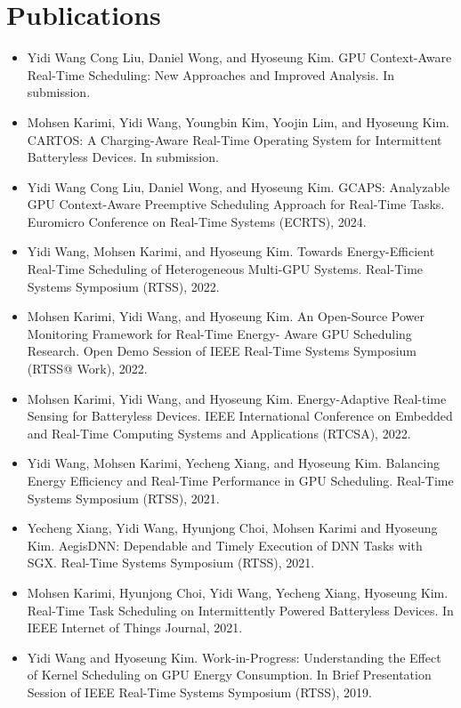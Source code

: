 \documentclass[letterpaper,10pt]{article}
\begin{document}
  \section{Publications}
  \begin{justify}
  \begin{itemize}
      \item Yidi Wang Cong Liu, Daniel Wong, and Hyoseung Kim. GPU Context-Aware Real-Time Scheduling: New Approaches and Improved Analysis. In submission.
      \item Mohsen Karimi, Yidi Wang, Youngbin Kim, Yoojin Lim, and Hyoseung Kim. CARTOS: A Charging-Aware Real-Time Operating System for Intermittent Batteryless Devices. In submission.
    \item Yidi Wang Cong Liu, Daniel Wong, and Hyoseung Kim. GCAPS: Analyzable GPU Context-Aware Preemptive Scheduling Approach for Real-Time Tasks. Euromicro Conference on Real-Time Systems (ECRTS), 2024.
    \item Yidi Wang, Mohsen Karimi, and Hyoseung Kim. Towards Energy-Efficient Real-Time Scheduling of Heterogeneous Multi-GPU Systems. Real-Time Systems Symposium (RTSS), 2022.
    \item Mohsen Karimi, Yidi Wang, and Hyoseung Kim. An Open-Source Power Monitoring Framework for Real-Time Energy- Aware GPU Scheduling Research. Open Demo Session of IEEE Real-Time Systems Symposium (RTSS@ Work), 2022.
    \item Mohsen Karimi, Yidi Wang, and Hyoseung Kim. Energy-Adaptive Real-time Sensing for Batteryless Devices. IEEE International Conference on Embedded and Real-Time Computing Systems and Applications (RTCSA), 2022.
    \item Yidi Wang, Mohsen Karimi, Yecheng Xiang, and Hyoseung Kim. Balancing Energy Efficiency and Real-Time Performance in GPU Scheduling. Real-Time Systems Symposium (RTSS), 2021.
    \item Yecheng Xiang, Yidi Wang, Hyunjong Choi, Mohsen Karimi and Hyoseung Kim. AegisDNN: Dependable and Timely Execution of DNN Tasks with SGX. Real-Time Systems Symposium (RTSS), 2021.
    \item Mohsen Karimi, Hyunjong Choi, Yidi Wang, Yecheng Xiang, Hyoseung Kim. Real-Time Task Scheduling on Intermittently Powered Batteryless Devices. In IEEE Internet of Things Journal, 2021.
    \item Yidi Wang and Hyoseung Kim. Work-in-Progress: Understanding the Effect of Kernel Scheduling on GPU Energy Consumption. In Brief Presentation Session of IEEE Real-Time Systems Symposium (RTSS), 2019.
  \end{itemize}
  \end{justify}
\end{document}
